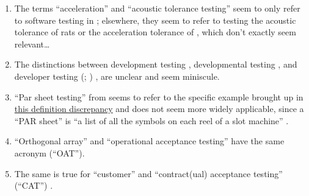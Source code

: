 \begin{enumerate}
    \item %
          The terms ``acceleration'' and ``acoustic tolerance testing'' seem
          to only refer to software testing in \citep[p.~56]{Firesmith2015};
          elsewhere, they seem to refer to testing the acoustic tolerance of
          rats \citep{HolleyEtAl1996} or the acceleration tolerance of
          \accelTolTest{}, which don't exactly seem relevant\dots%
    \item %
          The distinctions between development testing \citep[p.~136]{IEEE2017},
          developmental testing \citep[p.~30]{Firesmith2015}, and developer
          testing
          \ifnotpaper
              (\citealp[p.~39]{Firesmith2015}; \citealp[p.~11]{Gerrard2000a})
          \else
              \cite[p.~39]{Firesmith2015}, \cite[p.~11]{Gerrard2000a}
          \fi are unclear and seem miniscule.
          \ifnotpaper
    \item %
          ``Par sheet testing'' from \citepISTQB{} seems to refer to the
          specific example brought up in \hyperref[specificISTQB]
          {this definition discrepancy} and does not seem more widely
          applicable, since a ``PAR sheet'' is ``a list of all the symbols
          on each reel of a slot machine'' \citep{Bluejay2024}.%
           \fi
    \item %
          ``Orthogonal array'' \ifnotpaper \citetext{%
                  \citealp[pp.~5-1,~5-11]{SWEBOK2024};
                  implied by \citealp[pp.~467,~473]{Valcheva2013};
                  \citealp[pp.~1573-1577,~1580]{YuEtAl2011}} \else
              \cite[pp.~5-1,~5-11]{SWEBOK2024} \fi and ``operational
          acceptance testing'' \citep[p.~30]{Firesmith2015} have the same
          acronym (``OAT''). \ifnotpaper
    \item %
          The same is true for ``customer'' and ``contract(ual) acceptance
          testing'' (``CAT'') \citep[p.~30]{Firesmith2015}.

\end{enumerate}
